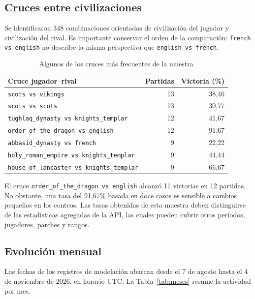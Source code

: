 \documentclass[12pt,a4paper]{article}
\begin{document}
\subsection{Cruces entre civilizaciones}

Se identificaron 348 combinaciones orientadas de civilización del jugador y civilización del rival. Es importante conservar el orden de la comparación: \texttt{french vs english} no describe la misma perspectiva que \texttt{english vs french}.

\begin{table}[htbp]
\centering\footnotesize
\caption{Algunos de los cruces más frecuentes de la muestra}
\label{tab:cruces}
\begin{tabular}{p{8.3cm}rr}
\toprule
\textbf{Cruce jugador--rival} & \textbf{Partidas} & \textbf{Victoria (\%)}\\
\midrule
\texttt{scots vs vikings} & 13 & 38,46\\
\texttt{scots vs scots} & 13 & 30,77\\
\texttt{tughlaq\_dynasty vs knights\_templar} & 12 & 41,67\\
\texttt{order\_of\_the\_dragon vs english} & 12 & 91,67\\
\texttt{abbasid\_dynasty vs french} & 9 & 22,22\\
\texttt{holy\_roman\_empire vs knights\_templar} & 9 & 44,44\\
\texttt{house\_of\_lancaster vs knights\_templar} & 9 & 66,67\\
\bottomrule
\end{tabular}
\end{table}

El cruce \texttt{order\_of\_the\_dragon vs english} alcanzó 11 victorias en 12 partidas. No obstante, una tasa del 91,67\% basada en doce casos es sensible a cambios pequeños en los conteos. Las tasas obtenidas de esta muestra deben distinguirse de las estadísticas agregadas de la API, las cuales pueden cubrir otros períodos, jugadores, parches y rangos.

\subsection{Evolución mensual}

Las fechas de los registros de modelación abarcan desde el 7 de agosto hasta el 4 de noviembre de 2026, en horario UTC. La Tabla~\ref{tab:meses} resume la actividad por mes.
\end{document}
